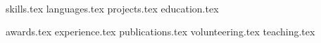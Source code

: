 \documentclass[letterpaper,11pt, fontspec]{article}
\begin{document}
\newline
\\


\sidebyside
    {{skills.tex}}
    {{languages.tex}}
{projects.tex}
{education.tex}

\pagebreak

{awards.tex}
{experience.tex}
{publications.tex}
{volunteering.tex}
{teaching.tex}
\end{document}
